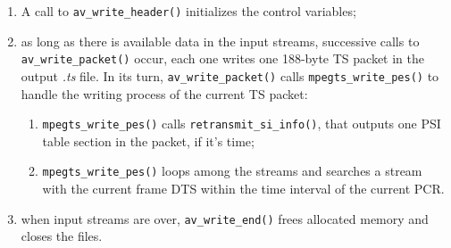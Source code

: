 \documentclass[
	12pt,				%
	openright,			%
	twoside,			%
	a4paper,			%
	brazil,
	french,				%
	english
	]{abntex2}
\begin{document}
\begin{enumerate}
	\item{A call to \texttt{av\hspace{0.1mm}\_\hspace{0.1mm}write\hspace{0.1mm}\_\hspace{0.1mm}header()} initializes the control variables;}
	\item{as long as there is available data in the input streams, successive calls to \texttt{av\hspace{0.1mm}\_\hspace{0.1mm}write\hspace{0.1mm}\_\hspace{0.1mm}packet()} occur, each one writes one 188-byte TS packet in the output \textit{.ts} file. In its turn, \texttt{av\hspace{0.1mm}\_\hspace{0.1mm}write\hspace{0.1mm}\_\hspace{0.1mm}packet()} calls \texttt{mpegts\hspace{0.1mm}\_\hspace{0.1mm}write\hspace{0.1mm}\_\hspace{0.1mm}pes()} to handle the writing process of the current TS packet:}
	\begin{enumerate}
		\item {\label{itm:ret_si_info} \texttt{mpegts\hspace{0.1mm}\_\hspace{0.1mm}write\hspace{0.1mm}\_\hspace{0.1mm}pes()} calls  \texttt{retransmit\hspace{0.1mm}\_\hspace{0.1mm}si\hspace{0.1mm}\_\hspace{0.1mm}info()}, that outputs one PSI table section in the packet, if it's time;}
		\item {\label{itm:dts_condition} \texttt{mpegts\hspace{0.1mm}\_\hspace{0.1mm}write\hspace{0.1mm}\_\hspace{0.1mm}pes()} loops among the streams and searches a stream with the current frame DTS within the time interval of the current PCR.}
	\end{enumerate}
	\item{when input streams are over, \texttt{av\hspace{0.1mm}\_\hspace{0.1mm}write\hspace{0.1mm}\_\hspace{0.1mm}end()} frees allocated memory and closes the files.}
\end{enumerate}
\end{document}
